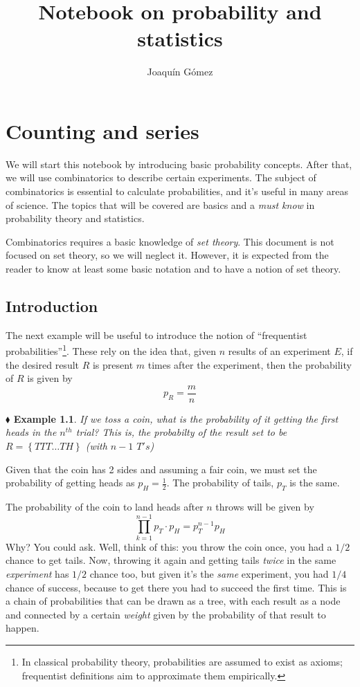 \documentclass{report}
\title{Notebook on probability and statistics}
\author{Joaquín Gómez}
\date{}
\newtheorem{example}{$\blacklozenge$ Example}[chapter]
\begin{document}
\maketitle
\chapter{Counting and series}
We will start this notebook by introducing basic probability concepts.
After that, we will use combinatorics to describe certain experiments.
The subject of combinatorics is essential to calculate probabilities,
and it's useful in many areas of science.
The topics that will be covered are basics and a \textit{must know} in
probability theory and statistics.

Combinatorics requires a basic knowledge of \textit{set theory}. This
document is not focused on set theory, so we will neglect it. However,
it is expected from the reader to know at least some basic notation and
to have a notion of set theory.

\section{Introduction}
The next example will be useful to introduce the notion of ``frequentist probabilities''\footnote{
    In classical probability theory, probabilities are assumed to exist as axioms; frequentist definitions aim to approximate them empirically.
}. These
rely on the idea that, given $n$ results of an experiment $E$, if the desired result $R$
is present $m$ times after the experiment, then the probability of $R$ is given by
\begin{equation}
    p_R = \frac{m}{n}
\end{equation}

\begin{example}
    If we toss a coin, what is the probability of it getting the first heads in the $n^{th}$ trial?
    This is, the probabilty of the result set to be $R = \left\{T T T \dots T H\right\}$
    (with $n-1$ $T's$)
\end{example}
Given that the coin has 2 sides and assuming a fair coin, we must set the probability of getting
heads as $p_H = \frac{1}{2}$. The probability of tails, $p_T$ is the same.

The probability of the coin to land heads after $n$ throws will be given by
\begin{equation}
    \prod_{k=1}^{n-1}{p_T} \cdot p_H = p_T^{n-1}p_H
\end{equation}
Why? You could ask. Well, think of this: you throw the coin once, you had a $1/2$ chance to get
tails. Now, throwing it again and getting tails \textit{twice} in the same \textit{experiment}
has $1/2$ chance too, but given it's the \textit{same} experiment, you had $1/4$ chance of success,
because to get there you had to succeed the first time. This is a chain of probabilities that
can be drawn as a tree, with each result as a node and connected by a certain \textit{weight} given
by the probability of that result to happen.
\end{document}

